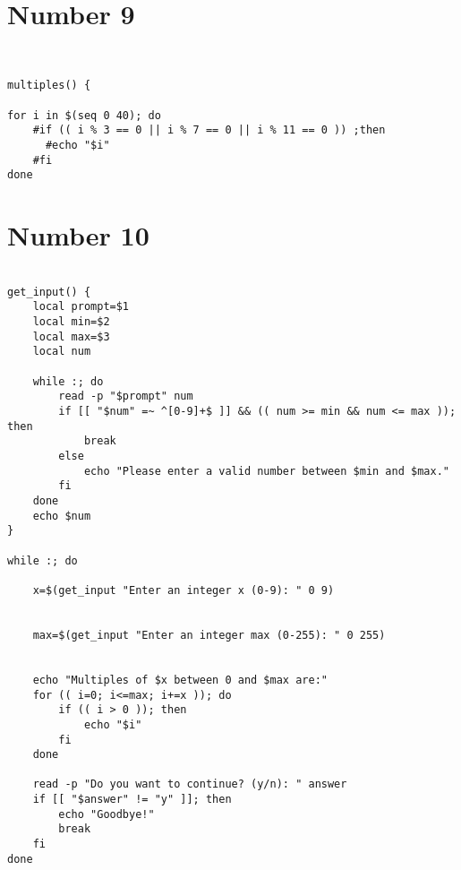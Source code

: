 \documentclass{article}
\begin{document}
\section*{Number 9}
\begin{verbatim}
    

multiples() {

for i in $(seq 0 40); do
    #if (( i % 3 == 0 || i % 7 == 0 || i % 11 == 0 )) ;then
      #echo "$i"
    #fi
done

\end{verbatim}
\section*{Number 10}

\begin{verbatim}

get_input() {
    local prompt=$1
    local min=$2
    local max=$3
    local num

    while :; do
        read -p "$prompt" num
        if [[ "$num" =~ ^[0-9]+$ ]] && (( num >= min && num <= max )); then
            break
        else
            echo "Please enter a valid number between $min and $max."
        fi
    done
    echo $num
}

while :; do
    
    x=$(get_input "Enter an integer x (0-9): " 0 9)

    
    max=$(get_input "Enter an integer max (0-255): " 0 255)

    
    echo "Multiples of $x between 0 and $max are:"
    for (( i=0; i<=max; i+=x )); do
        if (( i > 0 )); then
            echo "$i"
        fi
    done

    read -p "Do you want to continue? (y/n): " answer
    if [[ "$answer" != "y" ]]; then
        echo "Goodbye!"
        break
    fi
done
\end{verbatim}
\end{document}
